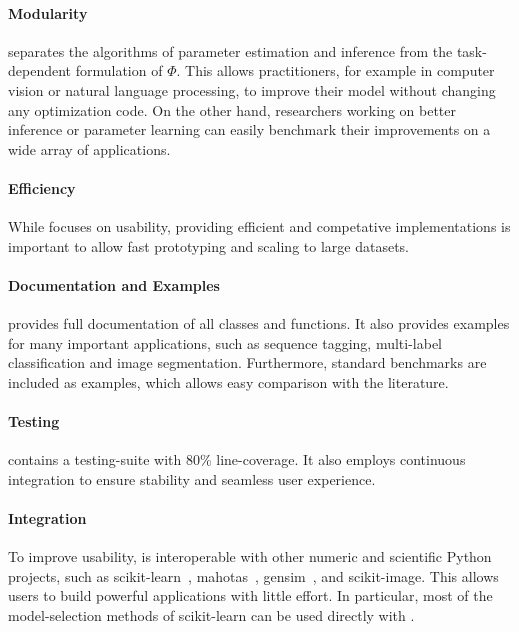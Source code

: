 \paragraph{Modularity} \pystruct separates the algorithms of parameter estimation and
     inference from the task-dependent formulation of $\Phi$. This allows
     practitioners, for example in computer vision or natural language
     processing, to improve their model without changing any optimization
     code. On the other hand, researchers working on better inference or
     parameter learning can easily benchmark their improvements on a wide
     array of applications.

\paragraph{Efficiency}
     While \pystruct focuses on usability, providing efficient and competative
     implementations is important to allow fast prototyping and scaling to
     large datasets.

\paragraph{Documentation and Examples}
     \pystruct provides full documentation of all classes and functions.  It
     also provides examples for many important applications, such as
     sequence tagging, multi-label classification and image segmentation.
     Furthermore, standard benchmarks are included as examples, which allows
     easy comparison with the literature.

\paragraph{Testing}
     \pystruct contains a testing-suite with 80\% line-coverage. It also employs continuous integration
     to ensure stability and seamless user experience.

\paragraph{Integration}
     To improve usability, \pystruct is interoperable with other numeric and scientific Python projects,
     such as {\sc scikit-learn}~\citep{pedregosa2011scikit},
     {\sc mahotas}~\citep{coelho:mahotas}, {\sc gensim}~\citep{rehurek_lrec}, and {\sc scikit-image}.
     This allows users to build powerful applications with little effort. In
     particular, most of the model-selection methods of {\sc scikit-learn} can be used
     directly with \pystruct.


